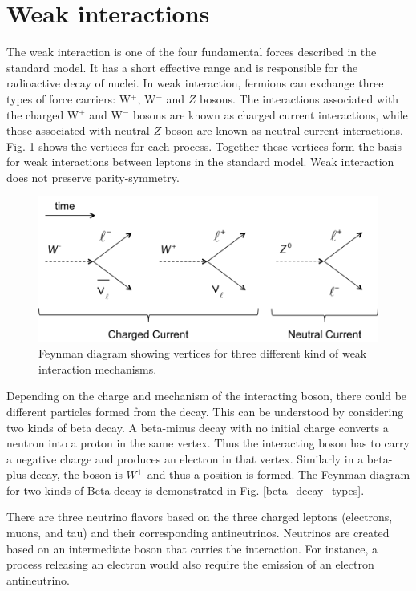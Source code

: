 \section{Weak interactions}
The weak interaction is one of the four fundamental forces described in the standard model. It has a short effective range and is responsible for the radioactive decay of nuclei. In weak interaction, fermions can exchange three types of force carriers: W$^+$, W$^-$ and $Z$ bosons. The interactions associated with the charged W$^+$ and W$^-$ bosons are known as charged current interactions, while those associated with neutral $Z$ boson are known as neutral current interactions. Fig. \ref{fig:weak_current} shows the vertices for each process. Together these vertices form the basis for weak interactions between leptons in the standard model. Weak interaction does not preserve parity-symmetry.\cite{wu_experiment}

\begin{figure}
\centering
\includegraphics[width=\linewidth]{ch1/figs/weak_current.png}
\caption{Feynman diagram showing vertices for three different kind of weak interaction mechanisms. \cite{ParticleDataGroup:2014cgo}}
\label{fig:weak_current}
\end{figure}


Depending on the charge and mechanism of the interacting boson, there could be different particles formed from the decay. This can be understood by considering two kinds of beta decay. A beta-minus decay with no initial charge converts a neutron into a proton in the same vertex. Thus the interacting boson has to carry a negative charge and produces an electron in that vertex. Similarly in a beta-plus decay, the boson is $W^+$ and thus a position is formed. The Feynman diagram for two kinds of Beta decay is demonstrated in Fig. \ref{beta_decay_types}.





There are three neutrino flavors based on the three charged leptons (electrons, muons, and tau) and their corresponding antineutrinos. Neutrinos are created based on an intermediate boson that carries the interaction. For instance, a process releasing an electron would also require the emission of an electron antineutrino. 

